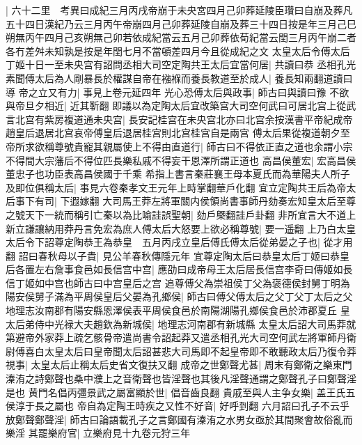 |{
	六十二里　考異曰成紀三月丙戌帝崩于未央宮四月己卯葬延陵臣瓚曰自崩及葬凡五十四日漢紀乃云三月丙午帝崩四月己卯葬延陵自崩及葬三十四日按是年三月己巳朔無丙午四月己亥朔無己卯若依成紀當云五月己卯葬依荀紀當云閏三月丙午崩二者各冇差舛未知孰是按是年閏七月不當頓差四月今且從成紀之文}
太皇太后令傅太后丁姬十日一至未央宫有詔問丞相大司空定陶共王太后宜當何居|{
	共讀曰恭}
丞相孔光素聞傅太后為人剛暴長於權謀自帝在襁褓而養長教道至於成人|{
	養長知兩翻道讀曰導}
帝之立又有力|{
	事見上卷元延四年}
光心恐傅太后與政事|{
	師古曰與讀曰豫}
不欲與帝旦夕相近|{
	近其靳翻}
即議以為定陶太后宜改築宫大司空何武曰可居北宫上從武言北宫有紫房複道通未央宫|{
	長安記桂宫在未央宫北亦曰北宫余按漢書平帝紀成帝趙皇后退居北宫哀帝傅皇后退居桂宫則北宫桂宫自是兩宫}
傅太后果從複道朝夕至帝所求欲稱尊號貴寵其親屬使上不得由直道行|{
	師古曰不得依正直之道也余謂小宗不得間大宗藩后不得位匹長樂私戚不得妄干恩澤所謂正道也}
高昌侯董宏|{
	宏高昌侯董忠子也功臣表高昌侯國于千乘}
希指上書言秦莊襄王母本夏氏而為華陽夫人所子及即位俱稱太后|{
	事見六卷秦孝文王元年上時掌翻華戶化翻}
宜立定陶共王后為帝太后事下有司|{
	下遐嫁翻}
大司馬王莽左將軍關内侯領尚書事師丹劾奏宏知皇太后至尊之號天下一統而稱引亡秦以為比喻詿誤聖朝|{
	劾戶槩翻詿戶卦翻}
非所宜言大不道上新立謙讓納用莽丹言免宏為庶人傅太后大怒要上欲必稱尊號|{
	要一遥翻}
上乃白太皇太后令下詔尊定陶恭王為恭皇　五月丙戌立皇后傅氏傅太后從弟晏之子也|{
	從才用翻}
詔曰春秋母以子貴|{
	見公羊春秋傳隱元年}
宜尊定陶太后曰恭皇太后丁姬曰恭皇后各置左右詹事食邑如長信宫中宫|{
	應劭曰成帝母王太后居長信宫李奇曰傳姬如長信丁姬如中宫也師古曰中宫皇后之宫}
追尊傅父為崇祖侯丁父為褒德侯封舅丁明為陽安侯舅子滿為平周侯皇后父晏為孔鄉侯|{
	師古曰傅父傅太后之父丁父丁太后之父地理志汝南郡有陽安縣恩澤侯表平周侯食邑於南陽湖陽孔鄉侯食邑於沛郡夏丘}
皇太后弟侍中光禄大夫趙欽為新城侯|{
	地理志河南郡有新城縣}
太皇太后詔大司馬莽就第避帝外家莽上疏乞骸骨帝遣尚書令詔起莽又遣丞相孔光大司空何武左將軍師丹衛尉傅喜白太皇太后曰皇帝聞太后詔甚悲大司馬即不起皇帝即不敢聽政太后乃復令莽視事|{
	太皇太后止稱太后史省文復扶又翻}
成帝之世鄭聲尤甚|{
	周末有鄭衛之樂東門溱洧之詩鄭聲也桑中濮上之音衛聲也皆淫聲也其後凡淫聲通謂之鄭聲孔子曰鄭聲淫是也}
黄門名倡丙彊景武之屬富顯於世|{
	倡音齒良翻}
貴戚至與人主争女樂|{
	盖王氏五侯淳于長之屬也}
帝自為定陶王時疾之又性不好音|{
	好呼到翻}
六月詔曰孔子不云乎放鄭聲鄭聲淫|{
	師古曰論語載孔子之言鄭國有溱洧之水男女亟於其間聚會故俗亂而樂淫}
其罷樂府官|{
	立樂府見十九卷元狩三年}
